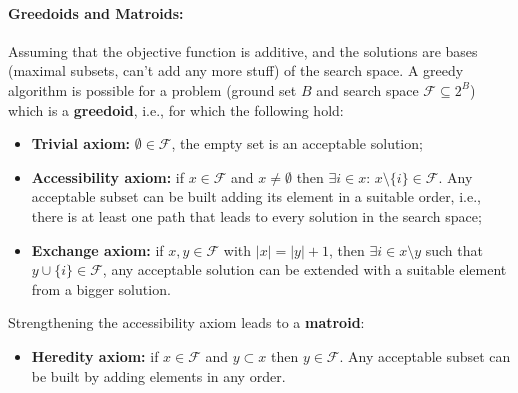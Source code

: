 \documentclass{article}
\begin{document}
	\paragraph{Greedoids and Matroids:} Assuming that the objective function is additive, and the solutions are bases (maximal subsets, can't add any more stuff) of the search space. A greedy algorithm is possible for a problem (ground set $B$ and search space $\mathcal{F} \subseteq 2^B$) which is a \textbf{greedoid}, i.e., for which the following hold: 
	\begin{itemize}
		\item \textbf{Trivial axiom:} $\emptyset \in \mathcal{F}$, the empty set is an acceptable solution;
		\item \textbf{Accessibility axiom:} if $x \in \mathcal{F}$ and $x \neq \emptyset$ then $\exists i \in x : \, x \setminus \{i\} \in \mathcal{F}$. Any acceptable subset can be built adding its element in a suitable order, i.e., there is at least one path that leads to every solution in the search space;
		\item \textbf{Exchange axiom:}  if $x, y \in \mathcal{F}$ with $|x| = |y| + 1$, then $\exists i \in x \setminus y$ such that $y \cup \{i\} \in \mathcal{F}$, any acceptable solution can be extended with a suitable element from a bigger solution.
	\end{itemize}
	Strengthening the accessibility axiom leads to a \textbf{matroid}: 
	\begin{itemize}
		\item \textbf{Heredity axiom:} if $x \in \mathcal{F}$ and $y \subset x$ then $y \in \mathcal{F}$. Any acceptable subset can be built by adding elements in any order.\\
	\end{itemize}
	
\end{document}

